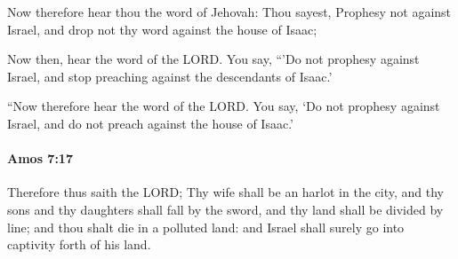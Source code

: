 			\begin{versebox}
					\item[BHS] 
					\item[LXX] 
					\item[ASV] Now therefore hear thou the word of Jehovah: Thou sayest, Prophesy not against Israel, and drop not thy word against the house of Isaac;
					\item[NIV] Now then, hear the word of the LORD. You say, “’Do not prophesy against Israel, and stop preaching against the descendants of Isaac.’
					\item[NRSV] “Now therefore hear the word of the LORD. You say, ‘Do not prophesy against Israel, and do not preach against the house of Isaac.’
			\end{versebox}

		\paragraph{Amos 7:17} %
			\label{AMOS-7-17}

			Therefore thus saith the LORD; Thy wife shall be an harlot in the city, and thy sons and thy daughters shall fall by the sword, and thy land shall be divided by line; and thou shalt die in a polluted land: and Israel shall surely go into captivity forth of his land.

